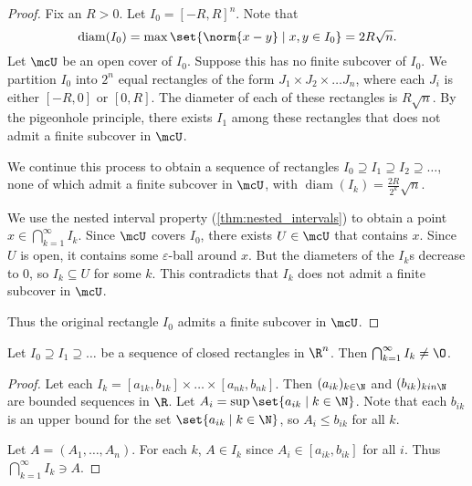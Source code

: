\begin{proof}
    Fix an $R > 0$.
    Let $I_0 = [-R, R]^n$.
    Note that \[
        \operatorname{diam}(I_0)
            = \max\set{\norm{x - y} \mid x, y \in I_0} = 2R \sqrt n.
    \] Let $\mcU$ be an open cover of $I_0$.
    Suppose this has no finite subcover of $I_0$.
    We partition $I_0$ into $2^n$ equal rectangles of the form
    $J_1 \times J_2 \times \dots J_n$, where each $J_i$ is either $[-R, 0]$
    or $[0, R]$.
    The diameter of each of these rectangles is $R \sqrt n$.
    By the pigeonhole principle, there exists $I_1$ among these rectangles
    that does not admit a finite subcover in $\mcU$.

    We continue this process to obtain a sequence of rectangles
    $I_0 \supseteq I_1 \supseteq I_2 \supseteq \dots$, none of which admit a
    finite subcover in $\mcU$, with
    $\operatorname{diam}(I_k) = \frac{2R}{2^k} \sqrt n$.

    We use the nested interval property (\cref{thm:nested_intervals}) to
    obtain a point $x \in \bigcap_{k = 1}^\infty I_k$.
    Since $\mcU$ covers $I_0$, there exists $U \in \mcU$ that contains $x$.
    Since $U$ is open, it contains some $\varepsilon$-ball around $x$.
    But the diameters of the $I_k$s decrease to $0$, so $I_k \subseteq U$ for
    some $k$.
    This contradicts that $I_k$ does not admit a finite subcover in $\mcU$.

    Thus the original rectangle $I_0$ admits a finite subcover in $\mcU$.
\end{proof}

\begin{lemma} \label{thm:nested_intervals}
    Let $I_0 \supseteq I_1 \supseteq \dots$ be a sequence of closed
    rectangles in $\R^n$.
    Then $\bigcap_{k = 1}^\infty I_k \ne \O$.
\end{lemma}
\begin{proof}
    Let each $I_k = [a_{1k}, b_{1k}] \times \dots \times [a_{nk}, b_{nk}]$.
    Then $(a_{ik})_{k \in \N}$ and $(b_{ik})_{k in \N}$ are
    bounded sequences in $\R$.
    Let $A_i = \sup\set{a_{ik} \mid k \in \N}$.
    Note that each $b_{ik}$ is an upper bound for the set
    $\set{a_{ik} \mid k \in \N}$, so $A_i \le b_{ik}$ for all $k$.

    Let $A = (A_1, \dots, A_n)$.
    For each $k$, $A \in I_k$ since $A_i \in [a_{ik}, b_{ik}]$ for all $i$.
    Thus $\bigcap_{k = 1}^\infty I_k \ni A$.
\end{proof}
